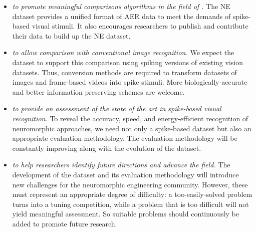 \begin{itemize}
	\item \textit{to promote meaningful comparisons \DIFdelbegin {}\DIFdelend \DIFaddbegin {}\DIFaddend algorithms \DIFaddbegin {}\DIFaddend in the field of \DIFdelbegin {}\DIFdelend \DIFaddbegin {}\DIFaddend .}
	The NE dataset provides a unified format of AER data to meet the demands of spike-based visual stimuli.
	It also encourages researchers to publish and contribute their data to build up the NE dataset.
	\item \textit{to allow comparison with conventional \DIFaddbegin {}\DIFaddend image recognition\DIFdelbegin {}\DIFdelend .}
	We expect the dataset to support this comparison using spiking versions of existing vision datasets.
	Thus, conversion methods are required to transform datasets of images and frame-based videos into spike stimuli.
	More biologically-accurate and better information preserving schemes are welcome.

	\item \textit{to provide an assessment of the state of the art in spike-based visual recognition\DIFdelbegin {}\DIFdelend .}
	To reveal the accuracy, speed, and energy-efficient recognition of neuromorphic approaches, we need not only a spike-based dataset but also an appropriate evaluation methodology.
	The evaluation methodology will be constantly improving along with the evolution of the dataset.
	\item \textit{to help researchers identify future directions and advance the field.}
	The development of the dataset and its evaluation methodology will introduce new challenges for the neuromorphic engineering community.
	However, these must represent an appropriate degree of difficulty: a too-easily-solved problem turns into a tuning competition, while a problem that is too difficult will not yield meaningful assessment.
	So suitable problems should continuously be added to promote future research.  
\end{itemize}


